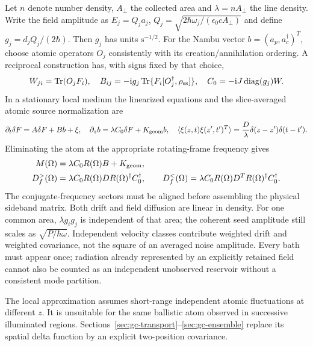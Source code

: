 \documentclass[11pt,a4paper]{article}
\newcommand{\ii}{\mathrm i}
\newcommand{\Tr}{\operatorname{Tr}}
\begin{document}
Let $n$ denote number density, $A_\perp$ the collected area and
$\lambda=nA_\perp$ the line density. Write the field amplitude as
$E_j=Q_ja_j$, $Q_j=\sqrt{2\hbar\omega_j/(\epsilon_0cA_\perp)}$ and define
$g_j=d_jQ_j/(2\hbar)$. Then $g_j$ has units $\mathrm{s}^{-1/2}$.
For the Nambu vector $b=(a_p,a_c^\dagger)^T$, choose atomic operators $O_j$
consistently with its creation/annihilation ordering. A reciprocal construction
has, with signs fixed by that choice,
\begin{equation}
 W_{ji}=\Tr(O_jF_i),\quad
 B_{ij}=-\ii g_j\Tr\{F_i[O_j^\dagger,\rho_{\rm ss}]\},\quad
 C_0=-\ii J\operatorname{diag}(g_j)W.
 \label{eq:gc-reciprocal-couplings}
\end{equation}
In a stationary local medium the linearized equations and the slice-averaged
atomic source normalization are
\begin{equation}
 \partial_t\delta F=A\delta F+Bb+\xi,\quad
 \partial_zb=\lambda C_0\delta F+K_{\rm geom}b,\quad
 \langle\xi(z,t)\xi(z',t')^T\rangle
 =\frac{D}{\lambda}\delta(z-z')\delta(t-t').
 \label{eq:gc-local-equations}
\end{equation}
Eliminating the atom at the appropriate rotating-frame frequency gives
\begin{align}
 M(\Omega)&=\lambda C_0R(\Omega)B+K_{\rm geom},\label{eq:gc-field-drift}\\
 D_f^>(\Omega)&=\lambda C_0R(\Omega)DR(\Omega)^\dagger C_0^\dagger,
 \qquad
 D_f^<(\Omega)=\lambda C_0R(\Omega)D^TR(\Omega)^\dagger C_0^\dagger.
 \label{eq:gc-field-diffusion}
\end{align}
The conjugate-frequency sectors must be aligned before assembling the physical
sideband matrix. Both drift and field diffusion are linear in density. For
one common area, $\lambda g_ig_j$ is independent of that area; the coherent
seed amplitude still scales as $\sqrt{P/\hbar\omega}$. Independent velocity
classes contribute weighted drift and weighted covariance, not the square of
an averaged noise amplitude. Every bath must appear once; radiation already
represented by an explicitly retained field cannot also be counted as an
independent unobserved reservoir without a consistent mode partition.

The local approximation assumes short-range independent atomic fluctuations
at different $z$. It is unsuitable for the same ballistic atom observed in
successive illuminated regions. Sections~\ref{sec:gc-transport}--\ref{sec:gc-ensemble}
replace its spatial delta function by an explicit two-position covariance.
\end{document}
